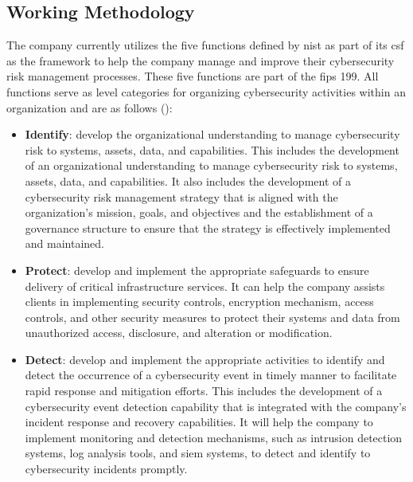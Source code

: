 \begin{multicols}{2}
      \subsection{Working Methodology}
      The company currently utilizes the five functions defined by \acrshort{nist} as part of its \acrshort{csf} as
      the framework to help the company manage and improve their cybersecurity risk management processes. These five
      functions are part of the \acrshort{fips} 199. All functions serve as level categories for organizing
      cybersecurity activities within an organization and are as follows (\cite{nist}):
      \begin{itemize}
            \item \textbf{Identify}: develop the organizational understanding to manage cybersecurity risk to
                  systems, assets, data, and capabilities. This includes the development of an organizational
                  understanding to manage cybersecurity risk to systems, assets, data, and capabilities. It also
                  includes the development of a cybersecurity risk management strategy that is aligned with the
                  organization's mission, goals, and objectives and the establishment of a governance structure to
                  ensure that the strategy is effectively implemented and maintained.
            \item \textbf{Protect}: develop and implement the appropriate safeguards to ensure delivery of critical
                  infrastructure services. It can help the company assists clients in implementing security controls,
                  encryption mechanism, access controls, and other security measures to protect their systems and
                  data from unauthorized access, disclosure, and alteration or modification.
            \item \textbf{Detect}: develop and implement the appropriate activities to identify and detect the
                  occurrence of a cybersecurity event in timely manner to facilitate rapid response and mitigation
                  efforts. This includes the development of a cybersecurity event detection capability that is
                  integrated with the company's incident response and recovery capabilities. It will help the
                  company to implement monitoring and detection mechanisms, such as intrusion detection systems,
                  log analysis tools, and \acrshort{siem} systems, to detect and identify to cybersecurity incidents
                  promptly.

\end{itemize}
\end{multicols}
